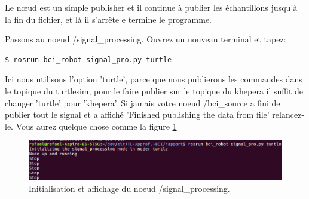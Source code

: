 Le nœud est un simple publisher et il continue à publier les échantillons jusqu'à la fin du fichier, et là il s'arrête e termine le programme.

Passons au noeud /signal\_processing. Ouvrez un nouveau terminal et tapez:

\begin{lstlisting}[language=bash]
  $ rosrun bci_robot signal_pro.py turtle
\end{lstlisting}

Ici nous utilisons l'option 'turtle', parce que nous publierons les commandes dans le topique du turtlesim, pour le faire publier sur le topique du khepera il suffit de changer 'turtle' pour 'khepera'. Si jamais votre noeud /bci\_source a fini de publier tout le signal et a affiché 'Finished publishing the data from file' relancez-le. Vous aurez quelque chose comme la figure \ref{fig:bci3}

\begin{figure}[!h]
  \centering
	\includegraphics[scale=0.50]{bci3.png}
	\caption{Initialisation et affichage du noeud /signal\_processing.}
	\label{fig:bci3}
\end{figure}

